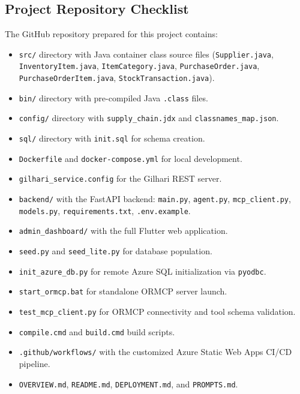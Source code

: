 \documentclass{book}
\begin{document}
\begin{appendices}
\chapter{Project Repository Checklist}
The GitHub repository prepared for this project contains:
\begin{itemize}
\item \texttt{src/} directory with Java container class source files (\texttt{Supplier.java}, \texttt{InventoryItem.java}, \texttt{ItemCategory.java}, \texttt{PurchaseOrder.java}, \texttt{PurchaseOrderItem.java}, \texttt{StockTransaction.java}).
\item \texttt{bin/} directory with pre-compiled Java \texttt{.class} files.
\item \texttt{config/} directory with \texttt{supply\_chain.jdx} and \texttt{classnames\_map.json}.
\item \texttt{sql/} directory with \texttt{init.sql} for schema creation.
\item \texttt{Dockerfile} and \texttt{docker-compose.yml} for local development.
\item \texttt{gilhari\_service.config} for the Gilhari REST server.
\item \texttt{backend/} with the FastAPI backend: \texttt{main.py}, \texttt{agent.py}, \texttt{mcp\_client.py}, \texttt{models.py}, \texttt{requirements.txt}, \texttt{.env.example}.
\item \texttt{admin\_dashboard/} with the full Flutter web application.
\item \texttt{seed.py} and \texttt{seed\_lite.py} for database population.
\item \texttt{init\_azure\_db.py} for remote Azure SQL initialization via \texttt{pyodbc}.
\item \texttt{start\_ormcp.bat} for standalone ORMCP server launch.
\item \texttt{test\_mcp\_client.py} for ORMCP connectivity and tool schema validation.
\item \texttt{compile.cmd} and \texttt{build.cmd} build scripts.
\item \texttt{.github/workflows/} with the customized Azure Static Web Apps CI/CD pipeline.
\item \texttt{OVERVIEW.md}, \texttt{README.md}, \texttt{DEPLOYMENT.md}, and \texttt{PROMPTS.md}.
\end{itemize}


\end{appendices}
\end{document}
